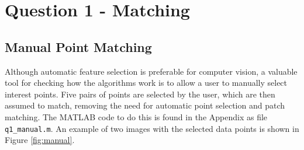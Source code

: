 \documentclass[a4paper, 10pt, conference]{ieeeconf}
\begin{document}
\section{Question 1 - Matching}
\subsection{Manual Point Matching}

Although automatic feature selection is preferable for computer vision, a valuable tool for checking how the algorithms work is to allow a user to manually select interest points. Five pairs of points are selected by the user, which are then assumed to match, removing the need for automatic point selection and patch matching. The MATLAB code to do this is found in the Appendix as file \texttt{q1\_manual.m}. An example of two images with the selected data points is shown in Figure \ref{fig:manual}.
\end{document}
